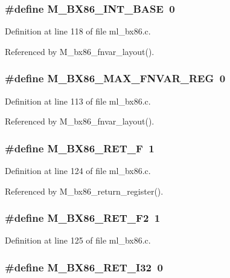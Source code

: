 \subsubsection{\setlength{\rightskip}{0pt plus 5cm}\#define M\_\-BX86\_\-INT\_\-BASE~0}\label{ml__bx86_8c_08e61348102edddcf3712071f6a48d8b}




Definition at line 118 of file ml\_\-bx86.c.

Referenced by M\_\-bx86\_\-fnvar\_\-layout().
\subsubsection{\setlength{\rightskip}{0pt plus 5cm}\#define M\_\-BX86\_\-MAX\_\-FNVAR\_\-REG~0}\label{ml__bx86_8c_dbd17eeeb49a7341b4f63ba3d47a149c}




Definition at line 113 of file ml\_\-bx86.c.

Referenced by M\_\-bx86\_\-fnvar\_\-layout().
\subsubsection{\setlength{\rightskip}{0pt plus 5cm}\#define M\_\-BX86\_\-RET\_\-F~1}\label{ml__bx86_8c_c91156ab6095c042fc190eb8b781e665}




Definition at line 124 of file ml\_\-bx86.c.

Referenced by M\_\-bx86\_\-return\_\-register().
\subsubsection{\setlength{\rightskip}{0pt plus 5cm}\#define M\_\-BX86\_\-RET\_\-F2~1}\label{ml__bx86_8c_5de09f36589c4fe6abededca8e8c80c4}




Definition at line 125 of file ml\_\-bx86.c.
\subsubsection{\setlength{\rightskip}{0pt plus 5cm}\#define M\_\-BX86\_\-RET\_\-I32~0}\label{ml__bx86_8c_3731fdf77f5148f3def08ced10876d46}




